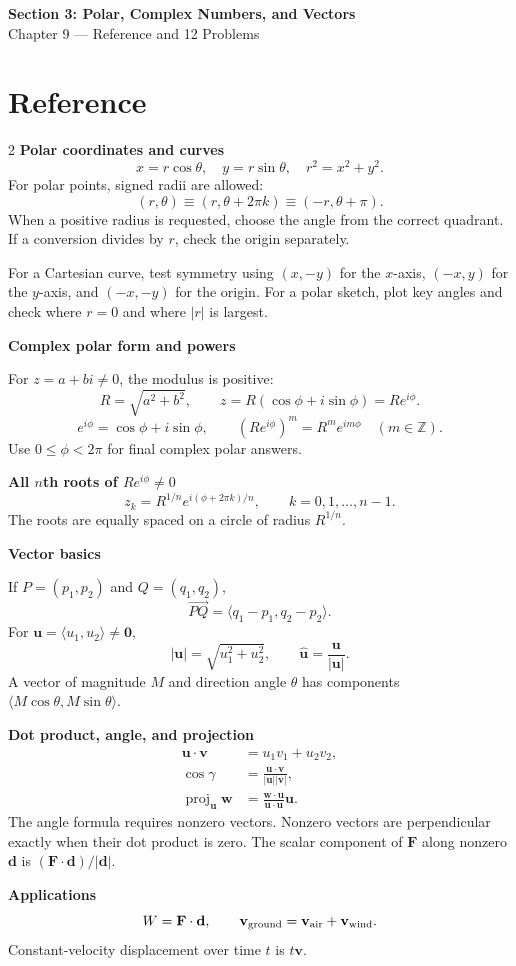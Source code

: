 \documentclass[11pt]{article}
\begin{document}
\newpage
\begin{center}
  {\Large\textbf{Section 3: Polar, Complex Numbers, and Vectors}}\\[3pt]
  Chapter 9 --- Reference and 12 Problems
\end{center}
\section*{Reference}
\begin{multicols}{2}
\small
\textbf{Polar coordinates and curves}
\[
  x=r\cos\theta,\quad y=r\sin\theta,\quad r^2=x^2+y^2.
\]
For polar points, signed radii are allowed:
\[
  (r,\theta)\equiv(r,\theta+2\pi k)\equiv(-r,\theta+\pi).
\]
When a positive radius is requested, choose the angle from the correct quadrant.
If a conversion divides by $r$, check the origin separately.

\medskip
For a Cartesian curve, test symmetry using $(x,-y)$ for the $x$-axis,
$(-x,y)$ for the $y$-axis, and $(-x,-y)$ for the origin. For a polar sketch,
plot key angles and check where $r=0$ and where $|r|$ is largest.

\medskip
\textbf{Complex polar form and powers}

For $z=a+bi\ne0$, the modulus is positive:
\[
  R=\sqrt{a^2+b^2},\qquad
  z=R(\cos\phi+i\sin\phi)=Re^{i\phi}.
\]
\[
  e^{i\phi}=\cos\phi+i\sin\phi,\qquad
  (Re^{i\phi})^m=R^me^{im\phi}\quad(m\in\mathbb Z).
\]
Use $0\le\phi<2\pi$ for final complex polar answers.

\medskip
\textbf{All $n$th roots of $Re^{i\phi}\ne0$}
\[
  z_k=R^{1/n}e^{i(\phi+2\pi k)/n},\qquad
  k=0,1,\ldots,n-1.
\]
The roots are equally spaced on a circle of radius $R^{1/n}$.

\columnbreak
\textbf{Vector basics}

If $P=(p_1,p_2)$ and $Q=(q_1,q_2)$,
\[
  \overrightarrow{PQ}=\langle q_1-p_1,q_2-p_2\rangle.
\]
For $\mathbf u=\langle u_1,u_2\rangle\ne\mathbf0$,
\[
  |\mathbf u|=\sqrt{u_1^2+u_2^2},\qquad
  \widehat{\mathbf u}=\frac{\mathbf u}{|\mathbf u|}.
\]
A vector of magnitude $M$ and direction angle $\theta$ has components
$\langle M\cos\theta,M\sin\theta\rangle$.

\medskip
\textbf{Dot product, angle, and projection}
\[
\begin{aligned}
  \mathbf u\cdot\mathbf v&=u_1v_1+u_2v_2,\\
  \cos\gamma&=\frac{\mathbf u\cdot\mathbf v}{|\mathbf u||\mathbf v|},\\
  \operatorname{proj}_{\mathbf u}\mathbf w
  &=\frac{\mathbf w\cdot\mathbf u}{\mathbf u\cdot\mathbf u}\mathbf u.
\end{aligned}
\]
The angle formula requires nonzero vectors. Nonzero vectors are perpendicular
exactly when their dot product is zero. The scalar component of $\mathbf F$
along nonzero $\mathbf d$ is $(\mathbf F\cdot\mathbf d)/|\mathbf d|$.

\medskip
\textbf{Applications}
\[
  W=\mathbf F\cdot\mathbf d,\qquad
  \mathbf v_{\rm ground}=\mathbf v_{\rm air}+\mathbf v_{\rm wind}.
\]
Constant-velocity displacement over time $t$ is $t\mathbf v$.
\end{multicols}
\end{document}
